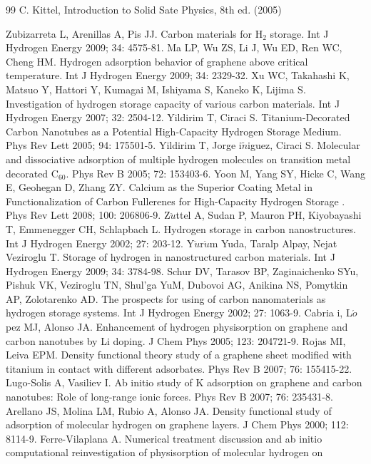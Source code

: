 {\begin{thebibliography} {99}
C. Kittel, Introduction to Solid Sate Physics, 8th ed. (2005)

Zubizarreta L, Arenillas A, Pis JJ. Carbon materials
for H$_{2}$ storage. Int J Hydrogen Energy 2009; 34: 4575-81.
Ma LP, Wu ZS, Li J, Wu ED, Ren WC, Cheng HM. Hydrogen
adsorption behavior of graphene above critical temperature. Int J
Hydrogen Energy 2009; 34: 2329-32.
Xu WC, Takahashi K, Matsuo Y, Hattori Y, Kumagai M,
Ishiyama S, Kaneko K, Lijima S. Investigation of hydrogen storage
capacity of various carbon materials. Int J Hydrogen Energy 2007;
32: 2504-12.
Yildirim T, Ciraci S. Titanium-Decorated Carbon Nanotubes as a Potential High-Capacity Hydrogen Storage
Medium. Phys Rev Lett 2005; 94: 175501-5.
Yildirim T, Jorge i$\tilde{n}$iguez, Ciraci S. Molecular and dissociative adsorption of multiple hydrogen molecules on transition metal decorated
C$_{60}$. Phys Rev B 2005; 72: 153403-6.
Yoon M, Yang SY, Hicke C, Wang E, Geohegan D, Zhang ZY. Calcium as the Superior Coating Metal in Functionalization of Carbon Fullerenes for High-Capacity Hydrogen Storage
. Phys Rev Lett 2008; 100: 206806-9.
Z$\ddot{u}$ttel A, Sudan P, Mauron PH, Kiyobayashi T,
Emmenegger CH, Schlapbach L. Hydrogen storage in carbon
nanostructures. Int J Hydrogen Energy 2002; 27: 203-12.
Y$\ddot{u}$r$\ddot{u}$m Yuda, Taralp Alpay, Nejat
Veziroglu T. Storage of hydrogen in nanostructured carbon materials.
Int J Hydrogen Energy 2009; 34: 3784-98.
Schur DV, Tarasov BP, Zaginaichenko SYu, Pishuk VK,
Veziroglu TN, Shul'ga YuM, Dubovoi AG, Anikina NS, Pomytkin AP,
Zolotarenko AD. The prospects for using of carbon nanomaterials as
hydrogen storage systems.  Int J Hydrogen Energy 2002; 27: 1063-9.
Cabria i, L$\acute{o}$pez MJ, Alonso JA. Enhancement of hydrogen physisorption on graphene and carbon nanotubes by Li
doping. J Chem Phys 2005; 123: 204721-9.
Rojas MI, Leiva EPM. Density functional theory study of a graphene sheet modified with titanium in contact with different
adsorbates. Phys Rev B 2007; 76: 155415-22.
Lugo-Solis A, Vasiliev I. Ab initio study of K adsorption on graphene and carbon nanotubes: Role of long-range ionic
forces. Phys Rev B 2007; 76: 235431-8.
Arellano JS, Molina LM, Rubio A, Alonso JA. Density functional study of adsorption of molecular hydrogen on graphene
layers. J Chem Phys 2000; 112: 8114-9.
Ferre-Vilaplana A. Numerical treatment discussion and ab initio computational reinvestigation of physisorption of molecular hydrogen on

\end{thebibliography}}
